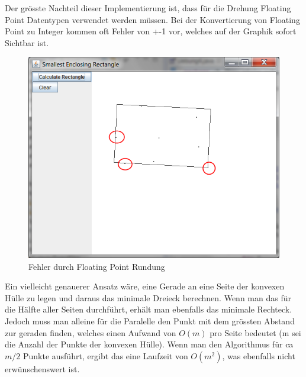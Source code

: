 \documentclass[10pt]{article}
\begin{document}
Der grösste Nachteil dieser Implementierung ist, dass für die Drehung Floating Point Datentypen verwendet werden müssen. Bei der Konvertierung von Floating Point zu Integer kommen oft Fehler von +-1 vor, welches auf der Graphik sofort Sichtbar ist. 

\begin{figure} [h!]
\includegraphics[scale= 0.75]{screenshot.png}
\caption{Fehler durch Floating Point Rundung}
\end{figure}

Ein vielleicht genauerer Ansatz wäre, eine Gerade an eine Seite der konvexen Hülle zu legen und daraus das minimale Dreieck berechnen. Wenn man das für die Hälfte aller Seiten durchführt, erhält man ebenfalls das minimale Rechteck. Jedoch muss man alleine für die Paralelle den Punkt mit dem grössten Abstand zur geraden finden, welches einen Aufwand von $O(m)$ pro Seite bedeutet (m sei die Anzahl der Punkte der konvexen Hülle). Wenn man den Algorithmus für ca $m/2$ Punkte ausführt, ergibt das eine Laufzeit von $O(m^2)$, was ebenfalls nicht erwünschenswert ist.
\end{document}

